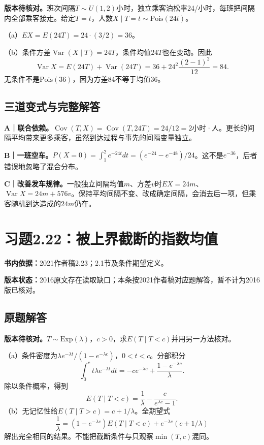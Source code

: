 \documentclass[
  11pt,
  a4paper,
  UTF8,fontset=fandol]{ctexart}
\let\OldSection\section
\renewcommand{\section}{\Needspace{7\baselineskip}\OldSection}
\let\OldSubsection\subsection
\renewcommand{\subsection}{\Needspace{5\baselineskip}\OldSubsection}
\begin{document}
\textbf{版本待核对。}班次间隔\(T\sim U(1,2)\)小时，独立乘客泊松率24/小时，每班把间隔内全部乘客接走。给定\(T=t\)，人数\(X\mid T=t\sim\mathrm{Pois}(24t)\)。

（a）\(EX=E(24T)=24\cdot(3/2)=\boxed{36}\)。

（b）条件方差\(\operatorname{Var}(X\mid T)=24T\)，条件均值\(24T\)也在变动。因此
\[\operatorname{Var}X=E(24T)+\operatorname{Var}(24T)=36+24^2\frac{(2-1)^2}{12}=\boxed{84}.\]
无条件不是\(\mathrm{Pois}(36)\)，因为方差84不等于均值36。

\subsection{三道变式与完整解答}\label{ux4e09ux9053ux53d8ux5f0fux4e0eux5b8cux6574ux89e3ux7b54-20}

\textbf{A｜联合依赖。}\(\operatorname{Cov}(T,X)=\operatorname{Cov}(T,24T)=24/12=2\)小时·人。更长的间隔平均带来更多乘客，虽然到达过程与事先的间隔变量独立。

\textbf{B｜一班空车。}\(P(X=0)=\int_1^2e^{-24t}dt=(e^{-24}-e^{-48})/24\)。这不是\(e^{-36}\)，后者错误地忽略了混合分布。

\textbf{C｜改善发车规律。}一般独立间隔均值\(m\)、方差\(v\)时\(EX=24m\)、\(\operatorname{Var}X=24m+576v\)。保持平均间隔不变、改成确定间隔，会消去后一项，但乘客随机到达造成的\(24m\)仍在。

\newpage

\section{习题2.22：被上界截断的指数均值}\label{ux4e60ux98982.22ux88abux4e0aux754cux622aux65adux7684ux6307ux6570ux5747ux503c}

\textbf{书内依据：}2021作者稿2.23；2.1节及条件期望定义。

\textbf{版本状态：}2016原文存在读取缺口；本条按2021作者稿对应题解答，暂不计为2016版已核对。

\subsection{原题解答}\label{ux539fux9898ux89e3ux7b54-21}

\textbf{版本待核对。}\(T\sim\mathrm{Exp}(\lambda)\)，\(c>0\)，求\(E(T\mid T<c)\)并用另一方法核对。

（a）条件密度为\(\lambda e^{-\lambda t}/(1-e^{-\lambda c})\)，\(0<t<c\)。分部积分
\[\int_0^c t\lambda e^{-\lambda t}dt=-ce^{-\lambda c}+\frac{1-e^{-\lambda c}}\lambda.\]
除以条件概率，得到
\[\boxed{E(T\mid T<c)=\frac1\lambda-\frac{c}{e^{\lambda c}-1}.}\]
（b）无记忆性给\(E(T\mid T>c)=c+1/\lambda\)。全期望式
\[\frac1\lambda=(1-e^{-\lambda c})E(T\mid T<c)+e^{-\lambda c}(c+1/\lambda)\]
解出完全相同的结果。不能把截断条件与只观察\(\min(T,c)\)混同。
\end{document}
